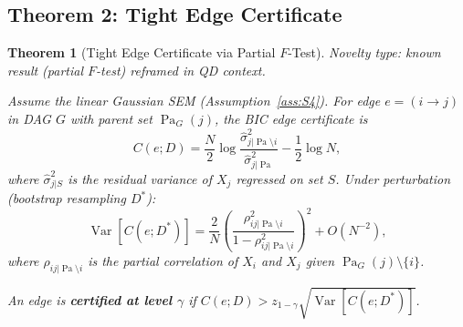 \documentclass{article}
\theoremstyle{definition}
\theoremstyle{plain}
\newtheorem{theorem}{Theorem}
\theoremstyle{remark}
\DeclareMathOperator{\Pa}{Pa}
\DeclareMathOperator{\Var}{Var}
\begin{document}
\subsection{Theorem 2: Tight Edge Certificate}

\begin{theorem}[Tight Edge Certificate via Partial $F$-Test]
\label{thm:certificate}
\emph{Novelty type: known result (partial $F$-test) reframed in QD context.}

Assume the linear Gaussian SEM (Assumption~\ref{ass:S4}). For edge
$e = (i \to j)$ in DAG $G$ with parent set $\Pa_G(j)$, the BIC edge certificate
is
$$C(e; D) = \frac{N}{2}\log\frac{\hat{\sigma}^2_{j|\Pa \setminus i}}
{\hat{\sigma}^2_{j|\Pa}} - \frac{1}{2}\log N,$$
where $\hat{\sigma}^2_{j|S}$ is the residual variance of $X_j$ regressed on
set $S$. Under perturbation (bootstrap resampling $D^*$):
\begin{equation}
\label{eq:cert_var}
\Var[C(e; D^*)] = \frac{2}{N}\left(\frac{\rho_{ij|\Pa\setminus i}^2}
{1 - \rho_{ij|\Pa\setminus i}^2}\right)^{\!2} + O(N^{-2}),
\end{equation}
where $\rho_{ij|\Pa\setminus i}$ is the partial correlation of $X_i$ and $X_j$
given $\Pa_G(j) \setminus \{i\}$.

An edge is \textbf{certified at level $\gamma$} if
$C(e; D) > z_{1-\gamma}\sqrt{\Var[C(e; D^*)]}$.
\end{theorem}
\end{document}
